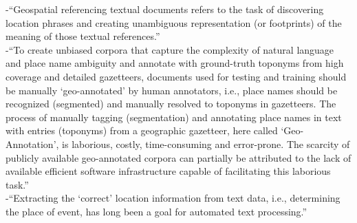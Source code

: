 -{\color{orange}“Geospatial referencing textual documents refers to the task of discovering location phrases and creating unambiguous representation (or footprints) of the meaning of those textual references.”\cite{Cai2016}}\\
-{\color{orange}“To create unbiased corpora that capture the complexity of natural language and place name ambiguity and annotate with ground-truth toponyms from high coverage and detailed gazetteers, documents used for testing and training should be manually ‘geo-annotated’ by human annotators, i.e., place names should be recognized (segmented) and manually resolved to toponyms in gazetteers. The process of manually tagging (segmentation) and annotating place names in text with entries (toponyms) from a geographic gazetteer, here called ‘Geo-Annotation’, is laborious, costly, time-consuming and error-prone. The scarcity of publicly available geo-annotated corpora can partially be attributed to the lack of available efficient software infrastructure capable of facilitating this laborious task.”\cite{Karimzadeh2019}}\\
-{\color{orange}“Extracting the ‘correct’ location information from text data, i.e., determining the place of event, has long been a goal for automated text processing.”\cite{Lee2019}}\\

